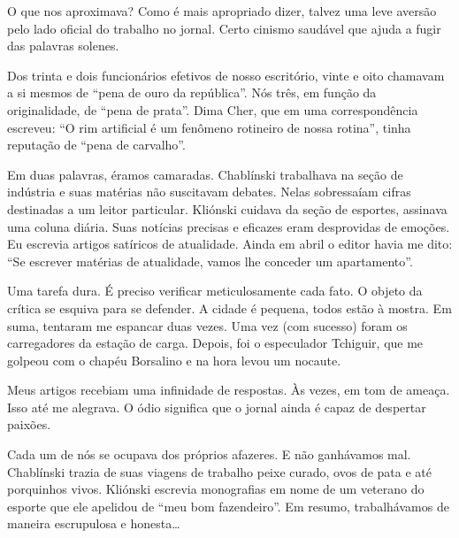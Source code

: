 O que nos aproximava? Como é mais apropriado dizer, talvez uma leve
aversão pelo lado oficial do trabalho no jornal. Certo cinismo saudável
que ajuda a fugir das palavras solenes.

Dos trinta e dois funcionários efetivos de nosso escritório, vinte e
oito chamavam a si mesmos de ``pena de ouro da república''. Nós três, em
função da originalidade, de ``pena de prata''. Dima Cher, que em uma
correspondência escreveu: ``O rim artificial é um fenômeno rotineiro de
nossa rotina'', tinha reputação de ``pena de carvalho''.

Em duas palavras, éramos camaradas. Chablínski trabalhava na seção de
indústria e suas matérias não suscitavam debates. Nelas sobressaíam
cifras destinadas a um leitor particular. Kliónski cuidava da seção de
esportes, assinava uma coluna diária. Suas notícias precisas e eficazes
eram desprovidas de emoções. Eu escrevia artigos satíricos de
atualidade. Ainda em abril o editor havia me dito: ``Se escrever
matérias de atualidade, vamos lhe conceder um apartamento''.

Uma tarefa dura. É preciso verificar meticulosamente cada fato. O objeto
da crítica se esquiva para se defender. A cidade é pequena, todos estão
à mostra. Em suma, tentaram me espancar duas vezes. Uma vez (com
sucesso) foram os carregadores da estação de carga. Depois, foi o
especulador Tchiguir, que me golpeou com o chapéu Borsalino e na hora
levou um nocaute.

Meus artigos recebiam uma infinidade de respostas. Às vezes, em tom de
ameaça. Isso até me alegrava. O ódio significa que o jornal ainda é
capaz de despertar paixões.

Cada um de nós se ocupava dos próprios afazeres. E não ganhávamos mal.
Chablínski trazia de suas viagens de trabalho peixe curado, ovos de pata
e até porquinhos vivos. Kliónski escrevia monografias em nome de um
veterano do esporte que ele apelidou de ``meu bom fazendeiro''. Em
resumo, trabalhávamos de maneira escrupulosa e honesta\ldots{}

